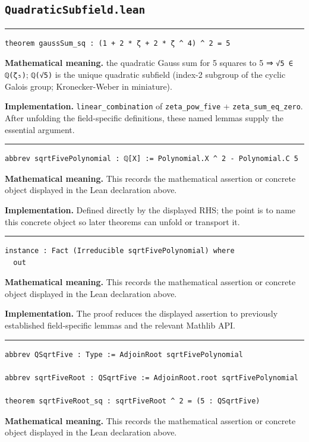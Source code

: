 \documentclass[UTF8,a4paper,11pt,fontset=fandol]{ctexart}
\theoremstyle{definition}
\newcommand{\statementsep}{\par\medskip\hrule\medskip}
\begin{document}
\subsection{\texttt{QuadraticSubfield.lean}}

\statementsep
\begin{verbatim}
theorem gaussSum_sq : (1 + 2 * ζ + 2 * ζ ^ 4) ^ 2 = 5
\end{verbatim}
\noindent\textbf{Mathematical meaning.} the quadratic Gauss sum for 5 squares to 5 ⇒ \texttt{√5 ∈ ℚ(ζ₅)}; \texttt{ℚ(√5)} is the unique quadratic subfield (index-2 subgroup of the cyclic Galois group; Kronecker-Weber in miniature).\par
\noindent\textbf{Implementation.} \texttt{linear\_\allowbreak{}combination} of \texttt{zeta\_\allowbreak{}pow\_\allowbreak{}five} + \texttt{zeta\_\allowbreak{}sum\_\allowbreak{}eq\_\allowbreak{}zero}. After unfolding the field-specific definitions, these named lemmas supply the essential argument.\par
\statementsep
\begin{verbatim}
abbrev sqrtFivePolynomial : ℚ[X] := Polynomial.X ^ 2 - Polynomial.C 5
\end{verbatim}
\noindent\textbf{Mathematical meaning.} This records the mathematical assertion or concrete object displayed in the Lean declaration above.\par
\noindent\textbf{Implementation.} Defined directly by the displayed RHS; the point is to name this concrete object so later theorems can unfold or transport it.\par
\statementsep
\begin{verbatim}
instance : Fact (Irreducible sqrtFivePolynomial) where
  out
\end{verbatim}
\noindent\textbf{Mathematical meaning.} This records the mathematical assertion or concrete object displayed in the Lean declaration above.\par
\noindent\textbf{Implementation.} The proof reduces the displayed assertion to previously established field-specific lemmas and the relevant Mathlib API.\par
\statementsep
\begin{verbatim}
abbrev QSqrtFive : Type := AdjoinRoot sqrtFivePolynomial

abbrev sqrtFiveRoot : QSqrtFive := AdjoinRoot.root sqrtFivePolynomial

theorem sqrtFiveRoot_sq : sqrtFiveRoot ^ 2 = (5 : QSqrtFive)
\end{verbatim}
\noindent\textbf{Mathematical meaning.} This records the mathematical assertion or concrete object displayed in the Lean declaration above.\par
\end{document}
